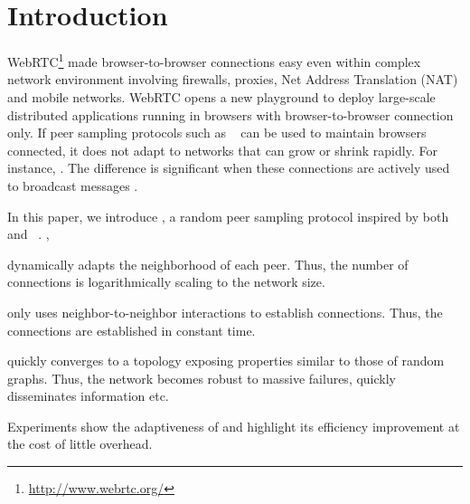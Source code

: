 
\section{Introduction}


WebRTC\footnote{\url{http://www.webrtc.org/}} made browser-to-browser
connections easy even within complex network environment involving firewalls,
proxies, Net Address Translation (NAT) and mobile networks. WebRTC opens a new
playground to deploy large-scale distributed applications running in browsers
with browser-to-browser connection only. If peer sampling protocols such as
\CYCLON~\cite{voulgaris2005cyclon} can be used to maintain browsers connected,
it does not adapt to networks that can grow or shrink rapidly. For instance,
. The difference is significant when
these connections are actively used to broadcast messages .

In this paper, we introduce \SPRAY, a random peer sampling protocol inspired by
both \SCAMP~\cite{ganesh2003peer}
and \CYCLON~\cite{voulgaris2005cyclon}. ,
\begin{inparaenum}[(i)]
\item \SPRAY dynamically adapts the neighborhood of each peer. Thus, the number
  of connections is logarithmically scaling to the network size.
\item \SPRAY only uses neighbor-to-neighbor interactions to establish
  connections. Thus, the connections are established in constant time.
\item \SPRAY quickly converges to a topology exposing properties similar to
  those of random graphs. Thus, the network becomes robust to massive failures,
  quickly disseminates information etc.
\item Experiments show the adaptiveness of \SPRAY and highlight its efficiency
  improvement at the cost of little overhead.
\end{inparaenum}

